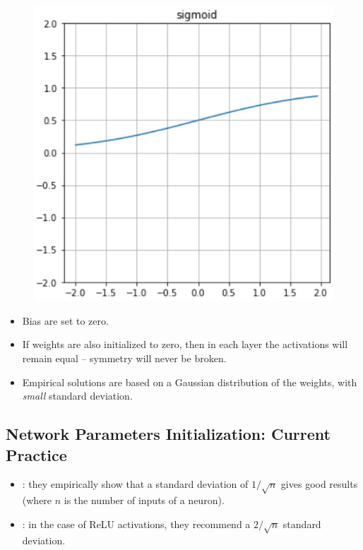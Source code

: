 \documentclass{book}
\begin{document}
\begin{minipage}{.3\textwidth}
\begin{figure}[h]
\centering
\includegraphics[width=\textwidth]{act_sigm.png}
\end{figure}
\end{minipage}%
\begin{minipage}{.7\textwidth}
\begin{itemize}
\item Bias are set to zero.
\item If weights are also initialized to zero, then in each layer the activations will remain equal -- symmetry will never be broken.
\item Empirical solutions are based on a Gaussian distribution of the weights, with \textit{small} standard deviation.
\end{itemize}
\end{minipage}

\subsection{Network Parameters Initialization: Current Practice}

\begin{itemize}
\item \cite{glorot_understanding_2010}: they empirically show that a standard deviation of $1/\sqrt{n}$ gives good results (where $n$ is the number of inputs of a neuron).
\item \cite{he_delving_2015}: in the case of ReLU activations, they recommend a $2/\sqrt{n}$ standard deviation.
\end{itemize}
\end{document}
